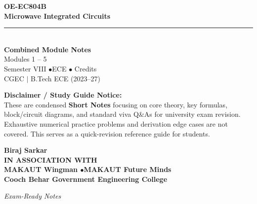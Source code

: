 \documentclass[12pt,a4paper]{article}
\begin{document}
\thispagestyle{empty}


\vspace*{1.0cm}
\begin{center}
  {\Huge\bfseries\color{myred} OE-EC804B}\\[10pt]
  {\LARGE\bfseries\color{mydark} Microwave Integrated Circuits}\\[20pt]
  {\color{myred}\rule{0.7\linewidth}{1.5pt}}\\[18pt]
  {\Large\color{myteal}\textbf{Combined Module Notes}}\\[8pt]
  {\large\color{mydark} Modules 1 -- 5}\\[40pt]
  {\normalsize\color{mydark} Semester VIII \quad$\bullet$\quad ECE \quad$\bullet$ Credits}\\[12pt]
  {\normalsize\color{mydark} CGEC \;$|$\; B.Tech ECE (2023--27)}
\end{center}
\vspace{1.0cm}
\begin{center}
  \begin{tcolorbox}[colback=mygray, colframe=mgframe, boxrule=0.5pt, arc=3pt, width=0.85\linewidth]
    \centering\small\color{mydark}
    \textbf{Disclaimer / Study Guide Notice:}\\
    These are condensed \textbf{Short Notes} focusing on core theory, key formulas, block/circuit diagrams, and standard viva Q\&As for university exam revision. Exhaustive numerical practice problems and derivation edge cases are not covered. This serves as a quick-revision reference guide for students.
  \end{tcolorbox}
\end{center}
\vfill
\vspace{0.6cm}
\begin{center}
  {\large\bfseries\color{mypurple} Biraj Sarkar}\\[16pt]
  {\footnotesize\color{watermark}\textbf{IN ASSOCIATION WITH}}\\[8pt]
  {\small\bfseries\color{mydark} MAKAUT Wingman \quad$\bullet$\quad MAKAUT Future Minds}\\[12pt]
  {\large\bfseries\color{myteal} Cooch Behar Government Engineering College}
\end{center}
\vfill
\begin{center}{\small\color{watermark}\textit{Exam-Ready Notes}}\end{center}
\clearpage
\end{document}
